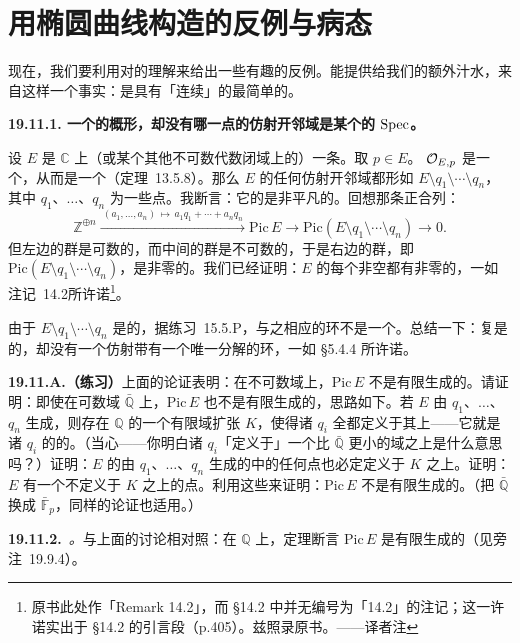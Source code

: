 
\section{用椭圆曲线构造的反例与病态}

现在，我们要利用对\trEllipticCurve{}的理解来给出一些有趣的反例。\trEllipticCurve{}能提供给我们的额外汁水，来自这样一个事实：\trEllipticCurve{}是具有「连续\trPicardGroup」的最简单的\trVariety。

\textbf{19.11.1. 一个\trFactorial{}的概形，却没有哪一点的仿射开邻域是某个\trUFD{}的 $\operatorname{Spec}$。}

设 $E$ 是 $\mathbb{C}$ 上（或某个其他不可数代数闭域上的）一条\trEllipticCurve。取 $p\in E$。\trLocalRing{} $\mathcal{O}_{E,p}$ 是一个\trDVR，从而是一个\trUFD（\mbox{定理~13.5.8}）。那么 $E$ 的任何仿射开邻域都形如 $E\setminus q_1\setminus\cdots\setminus q_n$，其中 $q_1$、$\dots$、$q_n$ 为一些点。我断言：它的\trPicardGroup{}是非平凡的。回想那条正合列：
\[
\mathbb{Z}^{\oplus n}\mathrel{\xrightarrow{\ (a_1,\dots,a_n)\,\mapsto\, a_1q_1+\cdots+a_nq_n\ }}\mathrm{Pic}\,E\longrightarrow\mathrm{Pic}(E\setminus q_1\setminus\cdots\setminus q_n)\longrightarrow 0.
\]
但左边的群是可数的，而中间的群是不可数的，于是右边的群，即 $\mathrm{Pic}(E\setminus q_1\setminus\cdots\setminus q_n)$，是非零的。我们已经证明：$E$ 的每个非空\trOpenSubset{}都有非零的\trLineBundle，一如\mbox{注记~14.2}所许诺\footnote{原书此处作「Remark 14.2」，而 \S14.2 中并无编号为「14.2」的注记；这一许诺实出于 \S14.2 的引言段（p.405）。兹照录原书。——译者注}。

由于 $E\setminus q_1\setminus\cdots\setminus q_n$ 是\trAffine{}的，据\mbox{练习~15.5.P}，与之相应的环不是一个\trUFD。总结一下：复\trEllipticCurve{}是\trFactorial{}的，却没有一个仿射\trOpenSubset{}带有一个唯一分解的环，一如 \S5.4.4 所许诺。

\textbf{19.11.A.（练习）}\quad 上面的论证表明：在不可数域上，$\mathrm{Pic}\,E$ 不是有限生成的\trGroup。请证明：即使在可数域 $\bar{\mathbb{Q}}$ 上，$\mathrm{Pic}\,E$ 也不是有限生成的，思路如下。若\trEllipticCurve{} $E$ 由 $q_1$、$\dots$、$q_n$ 生成，则存在 $\mathbb{Q}$ 的一个有限域扩张 $K$，使得诸 $q_i$ 全都定义于其上——它就是诸 $q_i$ 的\trResidueField{}的\trCompositum。（当心——你明白诸 $q_i$「定义于」一个比 $\bar{\mathbb{Q}}$ 更小的域之上是什么意思吗？）证明：$E$ 的由 $q_1$、$\dots$、$q_n$ 生成的\trSubgroup{}中的任何点也必定定义于 $K$ 之上。证明：$E$ 有一个不定义于 $K$ 之上的点。利用这些来证明：$\mathrm{Pic}\,E$ 不是有限生成的。（把 $\bar{\mathbb{Q}}$ 换成 $\bar{\mathbb{F}}_p$，同样的论证也适用。）

\textbf{19.11.2.}\ \emph{\trhRemark{}。}\quad 与上面的讨论相对照：在 $\mathbb{Q}$ 上，定理断言 $\mathrm{Pic}\,E$ 是有限生成的（见\mbox{旁注~19.9.4}）。

